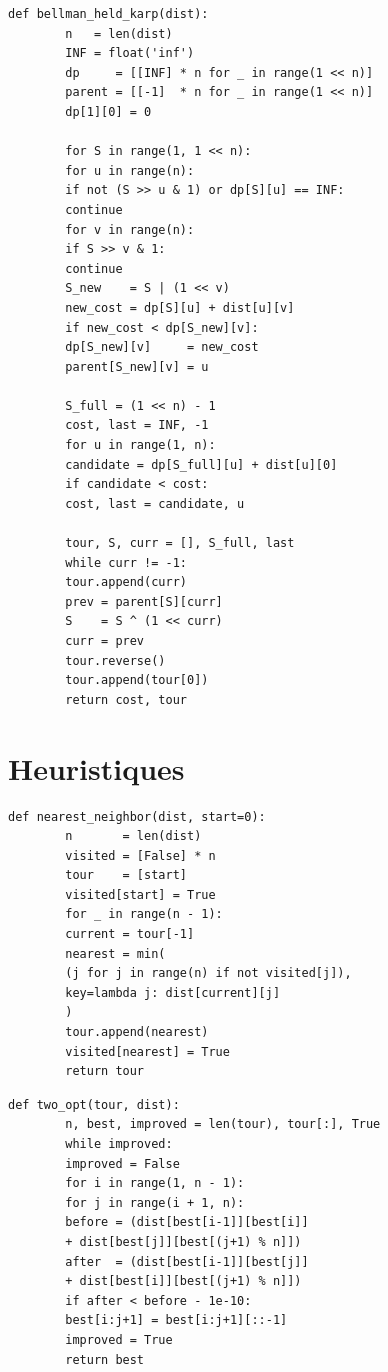 \documentclass[12pt, a4paper, twoside, openright]{book}
\begin{document}
	\begin{lstlisting}[caption={Programmation dynamique de Bellman-Held-Karp. Complexité $\mathcal{O}(n^2 2^n)$ en temps, $\mathcal{O}(n\,2^n)$ en espace.}, label={lst:bhk}]
		def bellman_held_karp(dist):
		n   = len(dist)
		INF = float('inf')
		dp     = [[INF] * n for _ in range(1 << n)]
		parent = [[-1]  * n for _ in range(1 << n)]
		dp[1][0] = 0
		
		for S in range(1, 1 << n):
		for u in range(n):
		if not (S >> u & 1) or dp[S][u] == INF:
		continue
		for v in range(n):
		if S >> v & 1:
		continue
		S_new    = S | (1 << v)
		new_cost = dp[S][u] + dist[u][v]
		if new_cost < dp[S_new][v]:
		dp[S_new][v]     = new_cost
		parent[S_new][v] = u
		
		S_full = (1 << n) - 1
		cost, last = INF, -1
		for u in range(1, n):
		candidate = dp[S_full][u] + dist[u][0]
		if candidate < cost:
		cost, last = candidate, u
		
		tour, S, curr = [], S_full, last
		while curr != -1:
		tour.append(curr)
		prev = parent[S][curr]
		S    = S ^ (1 << curr)
		curr = prev
		tour.reverse()
		tour.append(tour[0])
		return cost, tour
	\end{lstlisting}
	
	\section{Heuristiques}
	\label{ann:heuristiques}
	
	\begin{lstlisting}[caption={Plus proche voisin (Nearest Neighbor). Complexité $\mathcal{O}(n^2)$.}, label={lst:nn}]
		def nearest_neighbor(dist, start=0):
		n       = len(dist)
		visited = [False] * n
		tour    = [start]
		visited[start] = True
		for _ in range(n - 1):
		current = tour[-1]
		nearest = min(
		(j for j in range(n) if not visited[j]),
		key=lambda j: dist[current][j]
		)
		tour.append(nearest)
		visited[nearest] = True
		return tour
	\end{lstlisting}
	
	\begin{lstlisting}[caption={Amélioration 2-opt. Complexité $\mathcal{O}(n^2)$ par itération.}, label={lst:2opt}]
		def two_opt(tour, dist):
		n, best, improved = len(tour), tour[:], True
		while improved:
		improved = False
		for i in range(1, n - 1):
		for j in range(i + 1, n):
		before = (dist[best[i-1]][best[i]]
		+ dist[best[j]][best[(j+1) % n]])
		after  = (dist[best[i-1]][best[j]]
		+ dist[best[i]][best[(j+1) % n]])
		if after < before - 1e-10:
		best[i:j+1] = best[i:j+1][::-1]
		improved = True
		return best
	\end{lstlisting}
	
\end{document}
